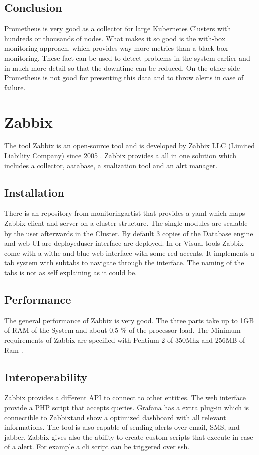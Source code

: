 \subsection{Conclusion}
Prometheus is very good as a collector for large Kubernetes Clusters with hundreds or thousands of nodes. What makes it so good is the with-box monitoring approach, which provides way more metrics than a black-box monitoring. These fact can be used to detect problems in the system earlier and in much more detail so that the downtime can be reduced. On the other side Prometheus is not good for presenting this data and to throw alerts in case of failure.

\section{Zabbix}
\label{Zabbix} %
\cite{Hernantes2015}
The tool Zabbix is an open-source tool and is developed by Zabbix LLC (Limited Liability Company) since 2005 \cite{zabbix}. Zabbix provides a all in one solution which includes a collector, aatabase, a sualization tool and an alrt manager.
\subsection{Installation}
There is an repository from monitoringartist \cite{zabbix_kube} that provides a yaml which maps Zabbix client and server on a cluster structure. The single modules are scalable by the user afterwards in the Cluster. By default 3 copies of the Database engine and web UI are deployeduser interface are deployed. In or Visual tools
Zabbix come with a withe and blue web interface with some red accents. It implements a tab system with subtabs to navigate through the interface. The naming of the tabs is not as self explaining as it could be.  
\subsection{Performance}
The general performance of Zabbix is very good. The three parts take up to 1GB of RAM of the System and about 0.5 \% of the processor load. The Minimum requirements of Zabbix are specified with Pentium 2 of 350Mhz and 256MB of Ram \cite{Marik2014}.
\subsection{Interoperability}
Zabbix provides a different API to connect to other entities. The web interface  provide a PHP script that accepts queries. Grafana has a extra plug-in which is connectible to Zabbixtand show a optimized dashboard with all relevant informations. The tool is also capable of sending alerts over email, SMS, and jabber. Zabbix gives also the ability to create custom scripts that execute in case of a alert. For example a cli script can be triggered over ssh. 
